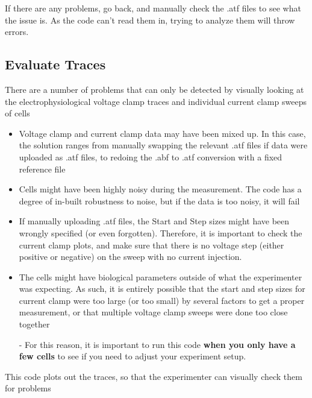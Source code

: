 \documentclass{article}
\begin{document}
If there are any problems, go back, and manually check the .atf files to see what the issue is. As the code can't read them in, trying to analyze them will throw errors.

\subsection{Evaluate Traces} \label{evaluate trace}

There are a number of problems that can only be detected by visually looking at the electrophysiological voltage clamp traces and individual current clamp sweeps of cells

\begin{itemize}
    \item Voltage clamp and current clamp data may have been mixed up. In this case, the solution ranges from manually swapping the relevant .atf files if data were uploaded as .atf files, to redoing the .abf to .atf conversion with a fixed reference file
    
    \item Cells might have been highly noisy during the measurement. The code has a degree of in-built robustness to noise, but if the data is too noisy, it will fail
    
    \item If manually uploading .atf files, the Start and Step sizes might have been wrongly specified (or even forgotten). Therefore, it is important to check the current clamp plots, and make sure that there is no voltage step (either positive or negative) on the sweep with no current injection.
    
    \item The cells might have biological parameters outside of what the experimenter was expecting. As such, it is entirely possible that the start and step sizes for current clamp were too large (or too small) by several factors to get a proper measurement, or that multiple voltage clamp sweeps were done too close together
    
    - For this reason, it is important to run this code \textbf{when you only have a few cells} to see if you need to adjust your experiment setup.
\end{itemize}

This code plots out the traces, so that the experimenter can visually check them for problems
\end{document}
